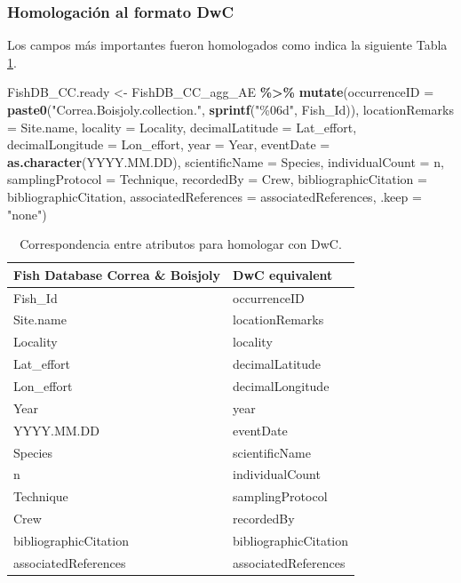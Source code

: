 \documentclass[sn-apa,pdflatex]{sn-jnl}
\newenvironment{Shaded}{\begin{snugshade}}{\end{snugshade}}
\newcommand{\AttributeTok}[1]{\textcolor[rgb]{0.13,0.29,0.53}{#1}}
\newcommand{\FunctionTok}[1]{\textcolor[rgb]{0.13,0.29,0.53}{\textbf{#1}}}
\newcommand{\NormalTok}[1]{#1}
\newcommand{\OtherTok}[1]{\textcolor[rgb]{0.56,0.35,0.01}{#1}}
\newcommand{\SpecialCharTok}[1]{\textcolor[rgb]{0.81,0.36,0.00}{\textbf{#1}}}
\newcommand{\StringTok}[1]{\textcolor[rgb]{0.31,0.60,0.02}{#1}}
\begin{document}
\subsubsection{Homologación al formato
DwC}\label{homologaciuxf3n-al-formato-dwc}

Los campos más importantes fueron homologados como indica la siguiente
Tabla \ref{tab:CCMB_DwC}.

\begin{Shaded}
\begin{Highlighting}[]
\NormalTok{FishDB\_CC.ready }\OtherTok{\textless{}{-}}\NormalTok{ FishDB\_CC\_agg\_AE }\SpecialCharTok{\%\textgreater{}\%}
    \FunctionTok{mutate}\NormalTok{(}\AttributeTok{occurrenceID =} \FunctionTok{paste0}\NormalTok{(}\StringTok{"Correa.Boisjoly.collection."}\NormalTok{,}
        \FunctionTok{sprintf}\NormalTok{(}\StringTok{"\%06d"}\NormalTok{, Fish\_Id)), }\AttributeTok{locationRemarks =}\NormalTok{ Site.name,}
        \AttributeTok{locality =}\NormalTok{ Locality, }\AttributeTok{decimalLatitude =}\NormalTok{ Lat\_effort, }\AttributeTok{decimalLongitude =}\NormalTok{ Lon\_effort,}
        \AttributeTok{year =}\NormalTok{ Year, }\AttributeTok{eventDate =} \FunctionTok{as.character}\NormalTok{(YYYY.MM.DD), }\AttributeTok{scientificName =}\NormalTok{ Species,}
        \AttributeTok{individualCount =}\NormalTok{ n, }\AttributeTok{samplingProtocol =}\NormalTok{ Technique, }\AttributeTok{recordedBy =}\NormalTok{ Crew,}
        \AttributeTok{bibliographicCitation =}\NormalTok{ bibliographicCitation, }\AttributeTok{associatedReferences =}\NormalTok{ associatedReferences,}
        \AttributeTok{.keep =} \StringTok{"none"}\NormalTok{)}
\end{Highlighting}
\end{Shaded}

\begingroup\fontsize{7}{9}\selectfont

\begin{longtable}[t]{>{\raggedright\arraybackslash}p{20em}>{\raggedright\arraybackslash}p{20em}}
\caption{\label{tab:CCMB_DwC}Correspondencia entre atributos para homologar con DwC.}\\
\toprule
Fish Database Correa \& Boisjoly & DwC equivalent\\
\midrule
Fish\_Id & occurrenceID\\
Site.name & locationRemarks\\
Locality & locality\\
Lat\_effort & decimalLatitude\\
Lon\_effort & decimalLongitude\\
\addlinespace
Year & year\\
YYYY.MM.DD & eventDate\\
Species & scientificName\\
n & individualCount\\
Technique & samplingProtocol\\
\addlinespace
Crew & recordedBy\\
bibliographicCitation & bibliographicCitation\\
associatedReferences & associatedReferences\\
\bottomrule
\end{longtable}
\endgroup{}
\end{document}

